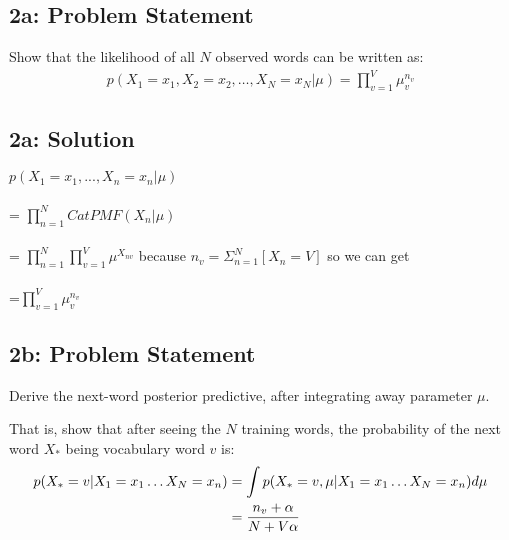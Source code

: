 \documentclass[10pt]{article}
\newcommand{\officialdirections}[1]{{\color{purple} #1}}
\begin{document}
\officialdirections{
\subsection*{2a: Problem Statement}

Show that the likelihood of all $N$ observed words can be written as:
\begin{align}
p(X_1 = x_1, X_2 = x_2, \ldots, X_N = x_N | \mu) = \prod_{v=1}^V \mu_v^{n_v}
\end{align}
}

\subsection{2a: Solution}
$p(X_1 = x_1, ..., X_n = x_n | \mu)$
\\
\\
= $\prod_{n=1}^NCatPMF(X_n|\mu)$ 
\\
\\
= $\prod_{n=1}^N\prod_{v=1}^V\mu^{X_{nv}}$ because $n_v = \Sigma_{n=1}^N[X_n = V]$ so we can get 
\\
\\
=$\prod_{v=1}^V\mu_{v}^{n_{v}}$


\officialdirections{
\subsection*{2b: Problem Statement}

Derive the next-word posterior predictive, after integrating away parameter $\mu$.

That is, show that after seeing the $N$ training words, the probability of the next word $X_*$ being vocabulary word $v$ is:
\begin{align}
p( X_* = v | X_1 = x_1 \ldots X_N = x_n)
	&= \int p( X_* = v, \mu | X_1 = x_1 \ldots X_N = x_n) d\mu
\notag \\
	&= \frac{n_v + \alpha}{N + V\alpha}
\end{align}
}
\end{document}
